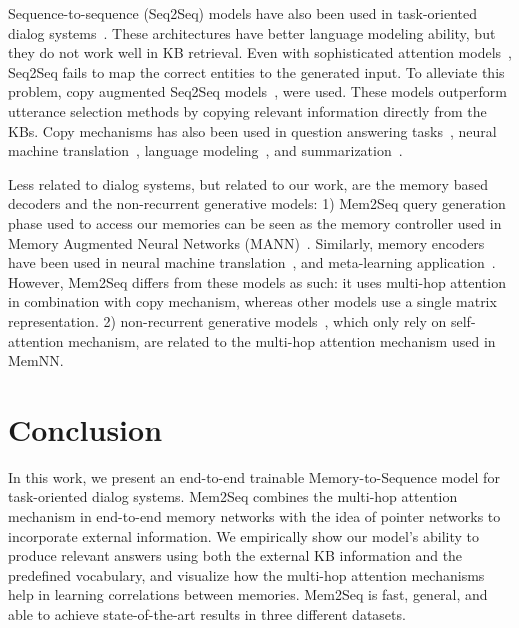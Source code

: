 \documentclass[11pt,a4paper]{article}
\begin{document}
Sequence-to-sequence (Seq2Seq) models have also been used in task-oriented dialog systems~\cite{zhao2017generative}. These architectures have better language modeling ability, but they do not work well in KB retrieval. Even with sophisticated attention models~\cite{luong-pham-manning:2015:EMNLP,bahdanau2014neural}, Seq2Seq fails to map the correct entities to the generated input. To alleviate this problem, copy augmented Seq2Seq models~\citet{eric-manning:2017:EACLshort}, were used. These models outperform utterance selection methods by copying relevant information directly from the KBs. Copy mechanisms has also been used in question answering tasks~\cite{Dehghani:2017:LAC:3132847.3133010,he-EtAl:2017:Long1}, neural machine translation~\cite{gulcehre-EtAl:2016:P16-1,gu-EtAl:2016:P16-1}, language modeling~\cite{merity2016pointer}, and summarization~\cite{see-liu-manning:2017:Long}. 

Less related to dialog systems, but related to our work, are the memory based decoders and the non-recurrent generative models: 1) Mem2Seq query generation phase used to access our memories can be seen as the memory controller used in Memory Augmented Neural Networks (MANN)~\cite{graves2014neural,graves2016hybrid}. Similarly, memory encoders have been used in neural machine translation~\cite{wang-EtAl:2016:EMNLP20161}, and meta-learning application~\cite{DBLP:journals/corr/KaiserNRB17}. However, Mem2Seq differs from these models as such: it uses multi-hop attention in combination with copy mechanism, whereas other models use a single matrix representation. 2) non-recurrent generative models~\cite{vaswani2017attention}, which only rely on self-attention mechanism, are related to the multi-hop attention mechanism used in MemNN.

\section{Conclusion}
In this work, we present an end-to-end trainable Memory-to-Sequence model for task-oriented dialog systems. Mem2Seq combines the multi-hop attention mechanism in end-to-end memory networks with the idea of pointer networks to incorporate external information. We empirically show our model's ability to produce relevant answers using both the external KB information and the predefined vocabulary, and visualize how the multi-hop attention mechanisms help in learning correlations between memories. Mem2Seq is fast, general, and able to achieve state-of-the-art results in three different datasets.
\end{document}

